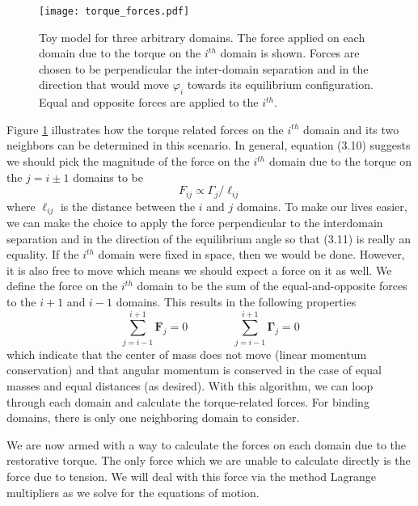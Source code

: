 	\begin{figure}[!hbt]
		\centering
		\texttt{[image: torque\_forces.pdf]}
		\caption[Torque related forces]{Toy model for three arbitrary domains. The force applied on each domain due to the torque on the $i^{th}$ domain is shown. Forces are chosen to be perpendicular the inter-domain separation and in the direction that would move $\varphi_i$ towards its equilibrium configuration. Equal and opposite forces are applied to the $i^{th}$.}
		\label{fig:torque_force}
	\end{figure}
	
	 Figure \ref{fig:torque_force} illustrates how the torque related forces on the $i^{th}$ domain and its two neighbors can be determined in this scenario. In general, equation (3.10) suggests we should pick the magnitude of the force on the $i^{th}$ domain due to the torque on the $j=i\pm1$ domains to be
	\begin{equation}
		F_{ij} \propto \Gamma_j / \ell_{ij}
	\end{equation}
	where $\ell_{ij}$ is the distance between the $i$ and $j$ domains. To make our lives easier, we can make the choice to apply the force perpendicular to the interdomain separation and in the direction of the equilibrium angle so that (3.11) is really an equality. If the $i^{th}$ domain were fixed in space, then we would be done. However, it is also free to move which means we should expect a force on it as well. We define the force on the $i^{th}$ domain to be the sum of the equal-and-opposite forces to the $i+1$ and $i-1$ domains. This results in the following properties
	\begin{equation}
		\sum\limits_{j=i-1}^{i+1}\mathbf{F}_j=0 \qquad\qquad \sum\limits_{j=i-1}^{i+1}\mathbf{\Gamma}_j = 0
	\end{equation}
	which indicate that the center of mass does not move (linear momentum conservation) and that angular momentum is conserved in the case of equal masses and equal distances (as desired). With this algorithm, we can loop through each domain and calculate the torque-related forces. For binding domains, there is only one neighboring domain to consider. 

	
	We are now armed with a way to calculate the forces on each domain due to the restorative torque. The only force which we are unable to calculate directly is the force due to tension. We will deal with this force via the method Lagrange multipliers as we solve for the equations of motion. 
	
